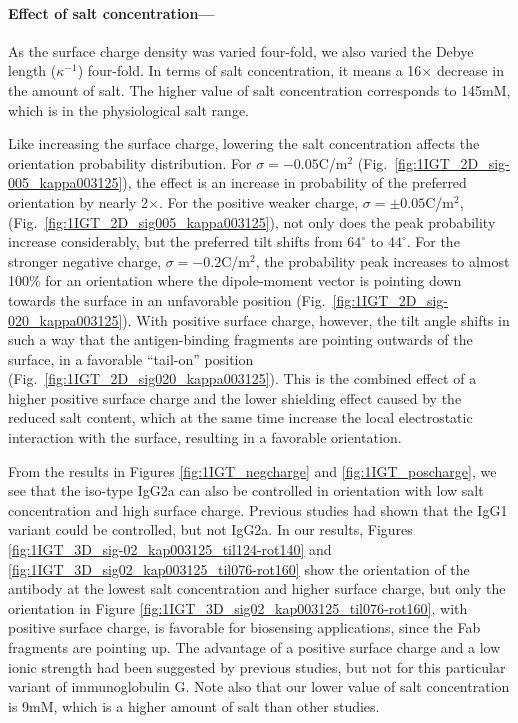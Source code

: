  \medskip
 
 \paragraph*{Effect of salt concentration---}
 
As the surface charge density was varied four-fold, we also varied the Debye length ($\kappa^{-1}$) four-fold. In terms of salt concentration, it means a 16$\times$ decrease in the amount of salt. The higher value of salt concentration corresponds to 145mM, which is in the physiological salt range.  
 
 Like increasing the surface charge, lowering the salt concentration affects the orientation probability distribution. For $\sigma=-0.05$C/m$^2$ (Fig.~\ref{fig:1IGT_2D_sig-005_kappa003125}), the effect is an increase in probability of the preferred orientation by nearly 2$\times$. For the positive weaker charge, $\sigma=\pm0.05$C/m$^2$, (Fig.~\ref{fig:1IGT_2D_sig005_kappa003125}), not only does the peak probability increase considerably, but the preferred tilt shifts from $64^{\circ}$ to $44^{\circ}$.
 For the stronger negative charge, $\sigma=-0.2$C/m$^2$, the probability peak increases to almost 100\% for an orientation where the dipole-moment vector is pointing down towards the surface in an unfavorable position (Fig.~\ref{fig:1IGT_2D_sig-020_kappa003125}).
 With positive surface charge, however, the tilt angle shifts in such a way that the antigen-binding fragments are pointing outwards of the surface, in a favorable ``tail-on'' position (Fig.~\ref{fig:1IGT_2D_sig020_kappa003125}). This is the combined effect of a higher positive surface charge and the lower shielding effect caused by the reduced salt content, which at the same time increase the local electrostatic interaction with the surface, resulting in a favorable orientation.

From the results in Figures \ref{fig:1IGT_negcharge} and \ref{fig:1IGT_poscharge}, we see that the iso-type IgG2a can also be controlled in orientation with low salt concentration and high surface charge. Previous studies had shown that the IgG1 variant could be controlled, but not IgG2a. 
In our results, Figures \ref{fig:1IGT_3D_sig-02_kap003125_til124-rot140} and \ref{fig:1IGT_3D_sig02_kap003125_til076-rot160} show the orientation of the antibody at the lowest salt concentration and higher surface charge, but only the orientation in Figure \ref{fig:1IGT_3D_sig02_kap003125_til076-rot160}, with positive surface charge, is favorable for biosensing applications, since the Fab fragments are pointing up.
The advantage of a positive surface charge and a low ionic strength had been suggested by previous studies, but not for this particular variant of immunoglobulin G. Note also that our lower value of salt concentration is 9mM, which is a higher amount of salt than other studies.\cite{BuijsETal1997,ChenLiuZhouJiang2003}

 
